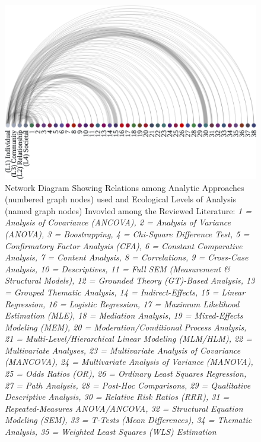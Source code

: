 \documentclass[11pt,]{tufte-book}
\begin{document}
\begin{figure}
\centering
\includegraphics{graphics/inputs/arc_analyses.png}
\caption{Network Diagram Showing Relations among Analytic Approaches
(numbered graph nodes) used and Ecological Levels of Analysis (named
graph nodes) Invovled among the Reviewed Literature:
\textit{1 = Analysis of Covariance (ANCOVA), 2 = Analysis of Variance (ANOVA), 3 = Boostrapping, 4 = Chi-Square Difference Test, 5 = Confirmatory Factor Analysis (CFA), 6 = Constant Comparative Analysis, 7 = Content Analysis, 8 = Correlations, 9 = Cross-Case Analysis, 10 = Descriptives, 11 = Full SEM (Measurement \& Structural Models), 12 = Grounded Theory (GT)-Based Analysis, 13 = Grouped Thematic Analysis, 14 = Indirect-Effects, 15 = Linear Regression, 16 = Logistic Regression, 17 = Maximum Likelihood Estimation (MLE), 18 = Mediation Analysis, 19 = Mixed-Effects Modeling (MEM), 20 = Moderation/Conditional Process Analysis, 21 = Multi-Level/Hierarchical Linear Modeling (MLM/HLM), 22 = Multivariate Analyses, 23 = Multivariate Analysis of Covariance (MANCOVA), 24 = Multivariate Analysis of Variance (MANOVA), 25 = Odds Ratios (OR), 26 = Ordinary Least Squares Regression, 27 = Path Analysis, 28 = Post-Hoc Comparisons, 29 = Qualitative Descriptive Analysis, 30 = Relative Risk Ratios (RRR), 31 = Repeated-Measures ANOVA/ANCOVA, 32 = Structural Equation Modeling (SEM), 33 = T-Tests (Mean Differences), 34 = Thematic Analysis, 35 = Weighted Least Squares (WLS) Estimation}\label{fig:arc_analyses}}
\end{figure}

\newpage
\end{document}
